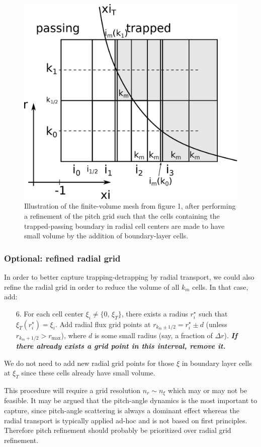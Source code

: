 \documentclass[11pt,a4paper]{article}
\newcommand{\sub}[1]{\ensuremath{_{\text{#1}}}}
\begin{document}
\begin{figure}
\begin{center}
\includegraphics[width=1.0\textwidth,trim=10mm 0 10mm 0]{trappedbc_fig_refined}
\caption{Illustration of the finite-volume mesh from figure 1, after performing a refinement of the pitch grid such that the cells containing the trapped-passing boundary in radial cell centers are made to have small volume by the addition of boundary-layer cells. }
\end{center}
\end{figure}

\subsubsection*{Optional: refined radial grid}
In order to better capture trapping-detrapping by radial transport, we could also refine the radial grid in order to reduce the volume of all $k_m$ cells. In that case, add:
\begin{enumerate}
\item[6.] For each cell center $\xi_i \neq \{0,\,\xi_T\}$, there exists a radius $r^\star_i$ such that $\xi_T(r^\star_i) = \xi_i$. Add radial flux grid points at $r_{k_m \pm 1/2} = r^\star_i \pm d$ (unless $r_{k_m+1/2}>r\sub{max}$), where $d$ is some small radius (say, a fraction of $\Delta r$). {\bf \emph{If there already exists a grid point in this interval, remove it.}}
\end{enumerate} 
We do not need to add new radial grid points for those $\xi$ in boundary layer cells at $\xi_T$ since these cells already have small volume.

This procedure will require a grid resolution $n_r \sim n_\xi$ which may or may not be feasible. It may be argued that the pitch-angle dynamics is the most important to capture, since pitch-angle scattering is always a dominant effect whereas the radial transport is typically applied ad-hoc and is not based on first principles. Therefore pitch refinement should probably be prioritized over radial grid refinement.
\end{document}
